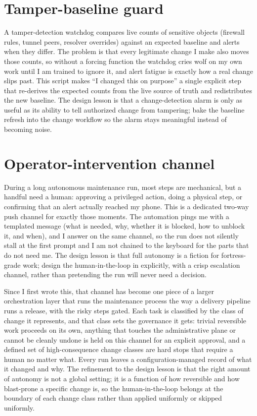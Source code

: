 \documentclass[12pt]{article}
\begin{document}
\section{Tamper-baseline guard}

A tamper-detection watchdog compares live counts of sensitive objects (firewall rules, tunnel peers, resolver overrides) against an expected baseline and alerts when they differ. The problem is that every legitimate change I make also moves those counts, so without a forcing function the watchdog cries wolf on my own work until I am trained to ignore it, and alert fatigue is exactly how a real change slips past. This script makes ``I changed this on purpose'' a single explicit step that re-derives the expected counts from the live source of truth and redistributes the new baseline. The design lesson is that a change-detection alarm is only as useful as its ability to tell authorized change from tampering; bake the baseline refresh into the change workflow so the alarm stays meaningful instead of becoming noise.

\section{Operator-intervention channel}

During a long autonomous maintenance run, most steps are mechanical, but a handful need a human: approving a privileged action, doing a physical step, or confirming that an alert actually reached my phone. This is a dedicated two-way push channel for exactly those moments. The automation pings me with a templated message (what is needed, why, whether it is blocked, how to unblock it, and when), and I answer on the same channel, so the run does not silently stall at the first prompt and I am not chained to the keyboard for the parts that do not need me. The design lesson is that full autonomy is a fiction for fortress-grade work; design the human-in-the-loop in explicitly, with a crisp escalation channel, rather than pretending the run will never need a decision.

Since I first wrote this, that channel has become one piece of a larger orchestration layer that runs the maintenance process the way a delivery pipeline runs a release, with the risky steps gated. Each task is classified by the class of change it represents, and that class sets the governance it gets: trivial reversible work proceeds on its own, anything that touches the administrative plane or cannot be cleanly undone is held on this channel for an explicit approval, and a defined set of high-consequence change classes are hard stops that require a human no matter what. Every run leaves a configuration-managed record of what it changed and why. The refinement to the design lesson is that the right amount of autonomy is not a global setting; it is a function of how reversible and how blast-prone a specific change is, so the human-in-the-loop belongs at the boundary of each change class rather than applied uniformly or skipped uniformly.
\end{document}
